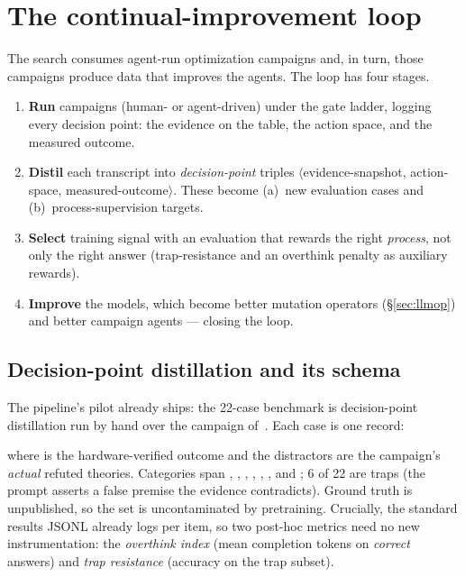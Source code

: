 \documentclass[11pt]{article}
\begin{document}
\section{The continual-improvement loop}
\label{sec:loop}

The search consumes agent-run optimization campaigns and, in turn, those campaigns produce data that
improves the agents. The loop has four stages.

\begin{enumerate}[leftmargin=1.6em,itemsep=2pt,topsep=2pt]
\item \textbf{Run} campaigns (human- or agent-driven) under the gate ladder, logging every decision point:
the evidence on the table, the action space, and the measured outcome.
\item \textbf{Distil} each transcript into \emph{decision-point} triples $\langle$evidence-snapshot,
action-space, measured-outcome$\rangle$. These become (a)~new evaluation cases and (b)~process-supervision
targets.
\item \textbf{Select} training signal with an evaluation that rewards the right \emph{process}, not only the
right answer (trap-resistance and an overthink penalty as auxiliary rewards).
\item \textbf{Improve} the models, which become better mutation operators (\S\ref{sec:llmop}) and better
campaign agents --- closing the loop.
\end{enumerate}

\subsection{Decision-point distillation and its schema}
\label{sec:distill}

The pipeline's pilot already ships: the 22-case  benchmark is decision-point distillation run
by hand over the campaign of~\cite{refutation}. Each case is one record:
\begin{quote}\small
{}
\end{quote}
where  is the hardware-verified outcome and the distractors are the campaign's \emph{actual}
refuted theories. Categories span , , , ,
, , and ; 6 of 22 are traps (the prompt asserts a false
premise the evidence contradicts). Ground truth is unpublished,
so the set is uncontaminated by pretraining. Crucially, the standard results JSONL already logs
 per item, so two post-hoc metrics need no new instrumentation: the
\emph{overthink index} (mean completion tokens on \emph{correct} answers) and \emph{trap resistance}
(accuracy on the trap subset).
\end{document}
